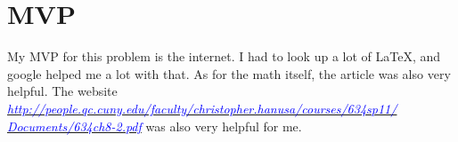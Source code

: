 \documentclass[11pt]{article} %
\begin{document}
\section{MVP}
My MVP for this problem is the internet. I had to look up a lot of \LaTeX, and google helped me a lot with that. As for the math itself, the article was also very helpful. 
The website \textit{\underline{\textcolor{blue}{http://people.qc.cuny.edu/faculty/christopher.hanusa/courses/634sp11/}}}  
\\ %
\textit{\underline{\textcolor{blue}{Documents/634ch8-2.pdf}}} was also very helpful for me. 
\end{document}

